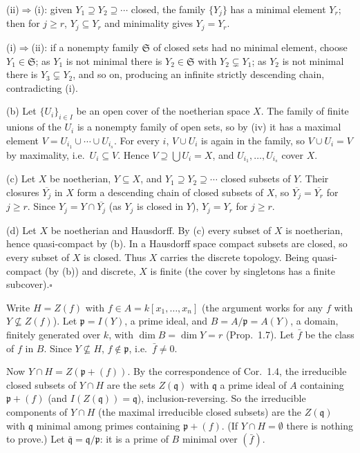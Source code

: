 \documentclass[11pt]{article}
\begin{document}
(ii)$\Rightarrow$(i): given $Y_1\supseteq Y_2\supseteq\cdots$ closed, the family $\{Y_j\}$ has a minimal element $Y_r$; then for $j\ge r$, $Y_j\subseteq Y_r$ and minimality gives $Y_j=Y_r$.

(i)$\Rightarrow$(ii): if a nonempty family $\mathfrak S$ of closed sets had no minimal element, choose $Y_1\in\mathfrak S$; as $Y_1$ is not minimal there is $Y_2\in\mathfrak S$ with $Y_2\subsetneq Y_1$; as $Y_2$ is not minimal there is $Y_3\subsetneq Y_2$, and so on, producing an infinite strictly descending chain, contradicting (i).

(b) Let $\{U_i\}_{i\in I}$ be an open cover of the noetherian space $X$. The family of finite unions of the $U_i$ is a nonempty family of open sets, so by (iv) it has a maximal element $V=U_{i_1}\cup\cdots\cup U_{i_s}$. For every $i$, $V\cup U_i$ is again in the family, so $V\cup U_i=V$ by maximality, i.e.\ $U_i\subseteq V$. Hence $V\supseteq\bigcup U_i=X$, and $U_{i_1},\dots,U_{i_s}$ cover $X$.

(c) Let $X$ be noetherian, $Y\subseteq X$, and $Y_1\supseteq Y_2\supseteq\cdots$ closed subsets of $Y$. Their closures $\overline{Y_j}$ in $X$ form a descending chain of closed subsets of $X$, so $\overline{Y_j}=\overline{Y_r}$ for $j\ge r$. Since $Y_j=Y\cap\overline{Y_j}$ (as $Y_j$ is closed in $Y$), $Y_j=Y_r$ for $j\ge r$.

(d) Let $X$ be noetherian and Hausdorff. By (c) every subset of $X$ is noetherian, hence quasi-compact by (b). In a Hausdorff space compact subsets are closed, so every subset of $X$ is closed. Thus $X$ carries the discrete topology. Being quasi-compact (by (b)) and discrete, $X$ is finite (the cover by singletons has a finite subcover).\hfill$\square$

\pf
Write $H=Z(f)$ with $f\in A=k[x_1,\dots,x_n]$ (the argument works for any $f$ with $Y\not\subseteq Z(f)$). Let $\mathfrak p=I(Y)$, a prime ideal, and $B=A/\mathfrak p=A(Y)$, a domain, finitely generated over $k$, with $\dim B=\dim Y=r$ (Prop.~1.7). Let $\bar f$ be the class of $f$ in $B$. Since $Y\not\subseteq H$, $f\notin\mathfrak p$, i.e.\ $\bar f\ne0$.

Now $Y\cap H=Z(\mathfrak p+(f))$. By the correspondence of Cor.~1.4, the irreducible closed subsets of $Y\cap H$ are the sets $Z(\mathfrak q)$ with $\mathfrak q$ a prime ideal of $A$ containing $\mathfrak p+(f)$ (and $I(Z(\mathfrak q))=\mathfrak q$), inclusion-reversing. So the irreducible components of $Y\cap H$ (the maximal irreducible closed subsets) are the $Z(\mathfrak q)$ with $\mathfrak q$ minimal among primes containing $\mathfrak p+(f)$. (If $Y\cap H=\emptyset$ there is nothing to prove.) Let $\bar{\mathfrak q}=\mathfrak q/\mathfrak p$: it is a prime of $B$ minimal over $(\bar f)$.
\end{document}
